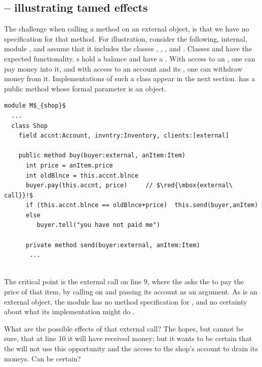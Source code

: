  

\subsection{ -- illustrating tamed effects} %
\label{sec:how}
\label{sec:shop}

The challenge when calling a method on an external object, is that we have no specification for that method. 
 For illustration, consider the following, internal, module \Mshop, and assume that it includes the classes , , , and . 
Classes  { and  have the expected functionality. 
s hold a balance and have a \password. 
With access to an , %
one  can pay money into it, 
and with access to an account  and its \password, one can withdraw money from it.
Implementations of such a class  appear in the next section.
}
   has  a public method  whose formal parameter  is an    object. 

\begin{lstlisting}[mathescape=true, language=Chainmail, frame=lines]
module M$_{shop}$
  ...   
  class Shop
    field accnt:Account, invntry:Inventory, clients:[external]    
  
    public method buy(buyer:external, anItem:Item)
      int price = anItem.price
      int oldBlnce = this.accnt.blnce
      buyer.pay(this.accnt, price)     // $\red{\mbox{external\ call}}!$
      if (this.accnt.blnce == oldBlnce+price)  this.send(buyer,anItem)
      else
         buyer.tell("you have not paid me") 
     
      private method send(buyer:external, anItem:Item)  
       ... 
        
\end{lstlisting}
 

The critical point is the external call on line 9,   {where the  asks the  to pay the price of that item,
by calling   on  and passing its account as an argument.
As  is an external object, the module \Mshop has no method specification for , and no 
certainty about what its implementation %
might do . 
}

{What are the possible effects of that external call?}
{The  hopes, but cannot be sure, that at line 10  it  will have received money; but 
it wants to be certain  that   the  will not use this opportunity and the access to the 
shop's account  to drain its moneys.
Can   be certain?}

